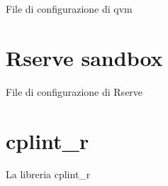 \documentclass[10pt,titlepage,twoside,a4paper]{report}
\newenvironment{code}{\singlespacing\captionsetup{type=listing}}{}
\begin{document}
    \newpage

    \begin{code}
        \caption{File di configurazione di qvm}
    \end{code}




\chapter{Rserve sandbox} \label{app:rserve-sandbox}
    \begin{code}
        \caption{File di configurazione di Rserve}
    \end{code}

\chapter{cplint\_r} \label{app:cplint-r}
    \begin{code}
        \caption{La libreria cplint\_r}
    \end{code}






\end{document}
